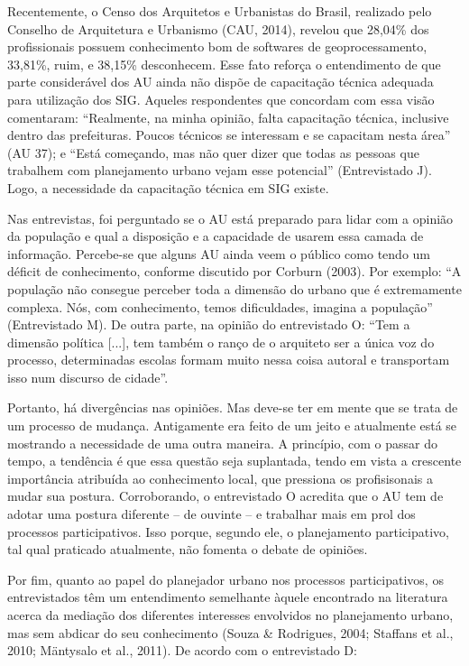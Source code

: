 \documentclass{article}
\begin{document}
Recentemente, o Censo dos Arquitetos e Urbanistas do Brasil, realizado pelo
Conselho de Arquitetura e Urbanismo (CAU,
2014), revelou que 28,04\% dos profissionais possuem conhecimento bom
de softwares de geoprocessamento, 33,81\%, ruim, e 38,15\%
desconhecem. Esse fato reforça o entendimento de que parte considerável dos AU
ainda não dispõe de capacitação técnica adequada para utilização dos SIG.
Aqueles respondentes que concordam com essa visão comentaram:
“Realmente, na minha opinião, falta capacitação técnica, inclusive
dentro das prefeituras. Poucos técnicos se interessam e se capacitam nesta
área” (AU 37); e “Está começando, mas não quer dizer que
todas as pessoas que trabalhem com planejamento urbano vejam esse
potencial” (Entrevistado J). Logo, a necessidade da capacitação
técnica em SIG existe.

Nas entrevistas, foi perguntado se o AU está preparado para lidar com a opinião
da população e qual a disposição e a capacidade de usarem essa camada de
informação. Percebe-se que alguns AU ainda veem o público como tendo um déficit
de conhecimento, conforme discutido por Corburn
(2003). Por exemplo: “A população não consegue perceber toda
a dimensão do urbano que é extremamente complexa. Nós, com conhecimento,
temos dificuldades, imagina a população” (Entrevistado M). De outra
parte, na opinião do entrevistado O: “Tem a dimensão política
[...], tem também o ranço de o arquiteto ser a única voz do processo,
determinadas escolas formam muito nessa coisa autoral e transportam isso num
discurso de cidade”.

Portanto, há divergências nas opiniões. Mas deve-se ter em mente que se trata de
um processo de mudança. Antigamente era feito de um jeito e atualmente está se
mostrando a necessidade de uma outra maneira. A princípio, com o passar do
tempo, a tendência é que essa questão seja suplantada, tendo em vista a
crescente importância atribuída ao conhecimento local, que pressiona os
profisisonais a mudar sua postura. Corroborando, o entrevistado O acredita que o
AU tem de adotar uma postura diferente – de ouvinte – e trabalhar mais em prol
dos processos participativos. Isso porque, segundo ele, o planejamento
participativo, tal qual praticado atualmente, não fomenta o debate de
opiniões.

Por fim, quanto ao papel do planejador urbano nos processos participativos, os
entrevistados têm um entendimento semelhante àquele encontrado na literatura
acerca da mediação dos diferentes interesses envolvidos no planejamento urbano,
mas sem abdicar do seu conhecimento (Souza
\& Rodrigues, 2004; Staffans et
al., 2010; Mäntysalo et al.,
2011). De acordo com o entrevistado D:
\end{document}
